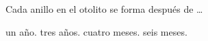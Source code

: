 Cada anillo en el otolito se forma después de \dots

\begin{oneparchoices}
    \choice un año.
    \choice tres años.
    \CorrectChoice cuatro meses.
    \choice seis meses.
\end{oneparchoices}

